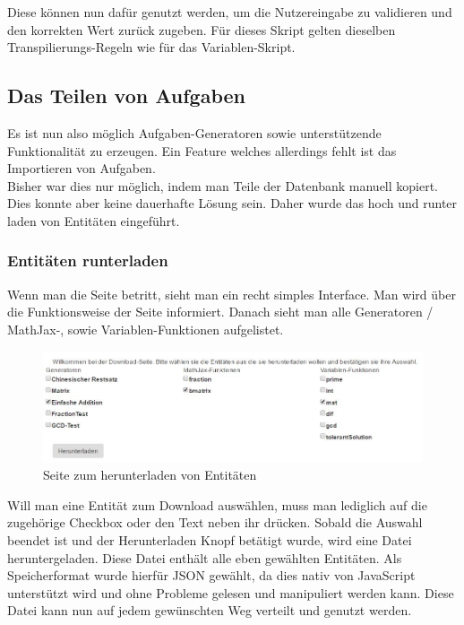 Diese können nun dafür genutzt werden, um die Nutzereingabe zu validieren und den korrekten Wert zurück zugeben. Für dieses Skript gelten dieselben Transpilierungs-Regeln wie für das Variablen-Skript.


\subsection{Das Teilen von Aufgaben}

Es ist nun also möglich Aufgaben-Generatoren sowie unterstützende Funktionalität zu erzeugen. Ein Feature welches allerdings fehlt ist das Importieren von Aufgaben.\\
Bisher war dies nur möglich, indem man Teile der Datenbank manuell kopiert. Dies konnte aber keine dauerhafte Lösung sein. Daher wurde das hoch und runter laden von Entitäten eingeführt.
\subsubsection{Entitäten runterladen}


Wenn man die Seite betritt, sieht man ein recht simples Interface. Man wird über die Funktionsweise der Seite informiert. Danach sieht man alle Generatoren / MathJax-, sowie Variablen-Funktionen aufgelistet. \\

\begin{figure}[htp]     %
\centering
\includegraphics[width=1\textwidth]{bilder/DownloadEntities} 
\caption[Seite zum herunterladen von Entitäten]{Seite zum herunterladen von Entitäten}
\end{figure} 


Will man eine Entität zum Download auswählen, muss man lediglich auf die zugehörige Checkbox oder den Text neben ihr drücken. Sobald die Auswahl beendet ist und der Herunterladen Knopf betätigt wurde, wird eine Datei heruntergeladen. Diese Datei enthält alle eben gewählten Entitäten. Als Speicherformat wurde hierfür JSON gewählt, da dies nativ von JavaScript unterstützt wird und ohne Probleme gelesen und manipuliert werden kann. Diese Datei kann nun auf jedem gewünschten Weg verteilt und genutzt werden.


